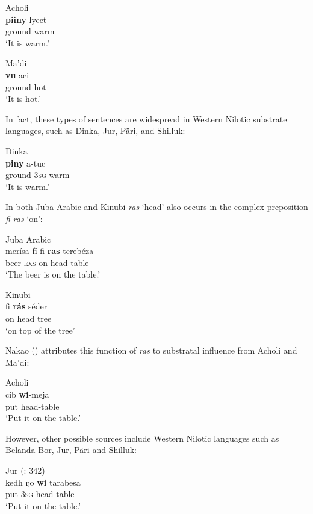 \documentclass[output=paper]{langsci/langscibook}
\begin{document}
\ea
{Acholi \citep[141]{Nakao2012}}\\
\gll \textbf{piiny} lyeet\\
     ground warm\\
\glt     `It is warm.'
\z

\ea
{Ma'di \citep[141]{Nakao2012}}\\
\gll \textbf{vu} aci\\
     ground hot\\
\glt     `It is hot.'
\z

In fact, these types of sentences are widespread in Western Nilotic substrate languages, such as Dinka, Jur, Päri, and Shilluk:

\ea
{Dinka \citep[202]{Nebel1979}}\\
\gll            \textbf{piny} a-tuc\\
                ground 3\textsc{sg}-warm\\
\glt     `It is warm.'
\z

  In both Juba Arabic and Kinubi \textit{ras} ‘head’ also occurs in the complex preposition \textit{fi} \textit{ras} ‘on’:

\ea
\ea Juba Arabic \citep[141]{Nakao2012}\\
\gll     merísa fí fi \textbf{ras} terebéza\\
         beer \textsc{exs} on head table\\
\glt       `The beer is on the table.'

\ex
Kinubi \citep[159]{Wellens2003}\\
\gll     fi \textbf{rá}\textbf{s} séder\\
         on head tree\\
\glt       `on top of the tree'
\z
\z

Nakao (\citeyear[141]{Nakao2012}) attributes this function of \textit{ras} to substratal influence from Acholi and Ma'di:

\ea
{Acholi \citep[141]{Nakao2012}}\\
\gll            cib \textbf{wi}-meja\\
                put head-table\\
\glt     `Put it on the table.'
\z
 
However, other possible sources include Western Nilotic languages such as Belanda Bor, Jur, Päri and Shilluk:

\ea
{Jur  (\citealt{PozzatiPanza1993}: 342)}\\
\gll     kedh ŋo \textbf{wi} tarabesa\\
         put 3\textsc{sg} head table\\
\glt     `Put it on the table.'
\z
\end{document}
